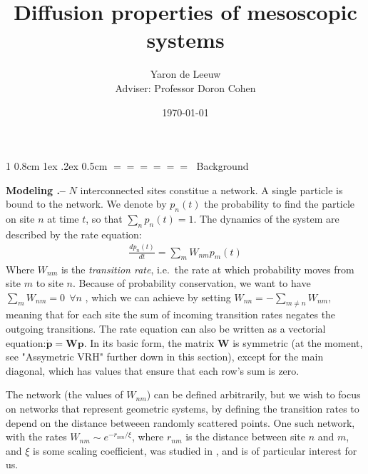 \documentclass[onecolumn,fleqn,notitlepage,secnumarabic]{revtex4}
\makeatletter
\def\section{%
  \@startsection
    {section}%
    {1}%
    {\z@}%
    {0.8cm \@plus1ex \@minus .2ex}%
    {0.5cm}%
    {\Large\bf $=\!=\!=\!=\!=\!=\;$}%
}%
\makeatother
\begin{document}
\title{Diffusion properties of mesoscopic systems}

\author{Yaron de Leeuw \\ Adviser: Professor Doron Cohen}
\date{\today}
\maketitle


\section{Background}


{ \bf Modeling .-- } $N$ interconnected sites constitue a network. A single particle is bound to the network. We denote by $p_n(t)$ the probability to find the particle on site $n$ at time $t$, so that $\sum_n p_n(t) =1$. The dynamics of the system are described by the rate equation:
\begin{align}
\frac{dp_n(t)}{dt} = \sum_m W_{nm}p_m(t)
\end{align}
Where $W_{nm}$ is the \emph{transition rate}, i.e.\ the rate at which probability moves from site $m$ to site $n$.
Because of probability conservation, we want to have $\sum_m W_{nm} = 0 \ \ \forall n$ , which we can achieve by setting $W_{nn} = -\sum_{m\ne n} W_{nm} $, meaning that for each site the sum of incoming transition rates negates the outgoing transitions.
The rate equation can also be written as a vectorial equation:$\boldsymbol{ \dot p } = \boldsymbol{W} \boldsymbol{p}$. In its basic form, the matrix $\boldsymbol{W}$ is symmetric (at the moment, see "Assymetric VRH" further down in this section), except for the main diagonal, which has values that ensure that each row's sum is zero.

The network (the values of $W_{nm}$) can be defined arbitrarily, but we wish to focus on networks that represent geometric systems, by defining the transition rates to depend on the distance betweeen randomly scattered points. One such network, with the rates $W_{nm}\sim e^{-r_{nm}/ \xi}$, where $r_{nm}$ is the distance between site $n$ and $m$, and $\xi$ is some scaling coefficient, was studied in \cite{Amir:2010:PRL}, and is of particular interest for us.
\end{document}
